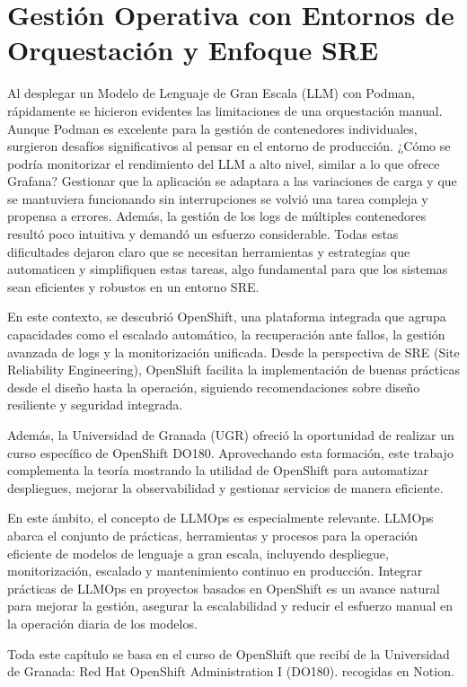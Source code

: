 \chapter{Gestión Operativa con Entornos de Orquestación y Enfoque SRE}
Al desplegar un Modelo de Lenguaje de Gran Escala (LLM) con Podman, rápidamente se hicieron evidentes las limitaciones de una orquestación manual. Aunque Podman es excelente para la gestión de contenedores individuales, surgieron desafíos significativos al pensar en el entorno de producción. ¿Cómo se podría monitorizar el rendimiento del LLM a alto nivel, similar a lo que ofrece Grafana? Gestionar que la aplicación se adaptara a las variaciones de carga y que se mantuviera funcionando sin interrupciones se volvió una tarea compleja y propensa a errores. Además, la gestión de los logs de múltiples contenedores resultó poco intuitiva y demandó un esfuerzo considerable. Todas estas dificultades dejaron claro que se necesitan herramientas y estrategias que automaticen y simplifiquen estas tareas, algo fundamental para que los sistemas sean eficientes y robustos en un entorno SRE.

En este contexto, se descubrió OpenShift, una plataforma integrada que agrupa capacidades como el escalado automático, la recuperación ante fallos, la gestión avanzada de logs y la monitorización unificada. Desde la perspectiva de SRE (Site Reliability Engineering), OpenShift facilita la implementación de buenas prácticas desde el diseño hasta la operación, siguiendo recomendaciones sobre diseño resiliente y seguridad integrada.

Además, la Universidad de Granada (UGR) ofreció la oportunidad de realizar un curso específico de OpenShift DO180. Aprovechando esta formación, este trabajo complementa la teoría mostrando la utilidad de OpenShift para automatizar despliegues, mejorar la observabilidad y gestionar servicios de manera eficiente.

En este ámbito, el concepto de LLMOps es especialmente relevante. LLMOps abarca el conjunto de prácticas, herramientas y procesos para la operación eficiente de modelos de lenguaje a gran escala, incluyendo despliegue, monitorización, escalado y mantenimiento continuo en producción. Integrar prácticas de LLMOps en proyectos basados en OpenShift es un avance natural para mejorar la gestión, asegurar la escalabilidad y reducir el esfuerzo manual en la operación diaria de los modelos. \cite{ref32}

Toda este capítulo se basa en el curso de OpenShift que recibí de la Universidad de Granada: Red Hat OpenShift Administration I (DO180). recogidas en Notion. \cite{ref33}


